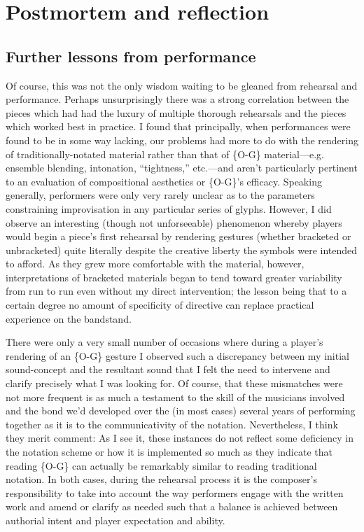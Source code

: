 \section{Postmortem and reflection}

    \subsection{Further lessons from performance}

    Of course, this was not the only wisdom waiting to be gleaned from rehearsal and performance. Perhaps unsurprisingly there was a strong correlation between the pieces which had had the luxury of multiple thorough rehearsals and the pieces which worked best in practice. I found that principally, when performances were found to be in some way lacking, our problems had more to do with the rendering of traditionally-notated material rather than that of \{O-G\} material---e.g. ensemble blending, intonation, ``tightness,'' etc.---and aren't particularly pertinent to an evaluation of compositional aesthetics or \{O-G\}'s efficacy. Speaking generally, performers were only very rarely unclear as to the parameters constraining improvisation in any particular series of glyphs. However, I did observe an interesting (though not unforseeable) phenomenon whereby players would begin a piece's first rehearsal by rendering gestures (whether bracketed or unbracketed) quite literally despite the creative liberty the symbols were intended to afford. As they grew more comfortable with the material, however, interpretations of bracketed materials began to tend toward greater variability from run to run even without my direct intervention; the lesson being that to a certain degree no amount of specificity of directive can replace practical experience on the bandstand.

    There were only a very small number of occasions where during a player's rendering of an \{O-G\} gesture I observed such a discrepancy between my initial sound-concept and the resultant sound that I felt the need to intervene and clarify precisely what I was looking for. Of course, that these mismatches were not more frequent is as much a testament to the skill of the musicians involved and the bond we'd developed over the (in most cases) several years of performing together as it is to the communicativity of the notation. Nevertheless, I think they merit comment: As I see it, these instances do not reflect some deficiency in the notation scheme or how it is implemented so much as they indicate that reading \{O-G\} can actually be remarkably similar to reading traditional notation. In both cases, during the rehearsal process it is the composer's responsibility to take into account the way performers engage with the written work and amend or clarify as needed such that a balance is achieved between authorial intent and player expectation and ability. 

